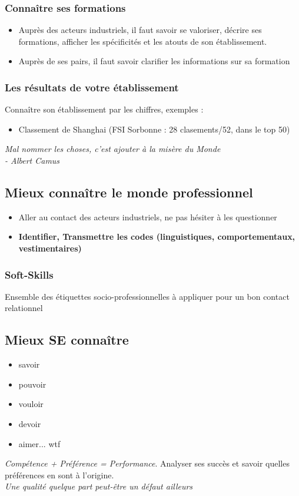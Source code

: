 \documentclass[10pt]{article}
\begin{document}
\subsubsection{Connaître ses formations}
\begin{itemize}
  \item Auprès des acteurs industriels, il faut savoir se valoriser, décrire ses
formations, afficher les spécificités et les atouts de son établissement.
  \item Auprès de ses pairs, il faut savoir clarifier les informations sur sa
formation
\end{itemize}

\subsubsection{Les résultats de votre établissement}

Connaître son établissement par les chiffres, exemples :
\begin{itemize}
  \item Classement de Shanghai (FSI Sorbonne : 28 clasements/52, dans le top 50)
\end{itemize}
{\it Mal nommer les choses, c'est ajouter à la misère du Monde\\- Albert Camus}

\subsection{Mieux connaître le monde professionnel}
\begin{itemize}
  \item Aller au contact des acteurs industriels, ne pas hésiter à les questionner
  \item {\bf Identifier, Transmettre les codes (linguistiques, comportementaux,
vestimentaires)}
\end{itemize}

\subsubsection{Soft-Skills}
Ensemble des étiquettes socio-professionnelles à appliquer pour un bon contact
relationnel
\subsection{Mieux SE connaître}
\begin{itemize}
  \item savoir
  \item pouvoir
  \item vouloir
  \item devoir
  \item aimer... wtf
\end{itemize}
{\it Compétence + Préférence = Performance}. Analyser ses succès et savoir quelles
préférences en sont à l'origine.\\
{\it Une qualité quelque part peut-être un défaut ailleurs}
\end{document}
